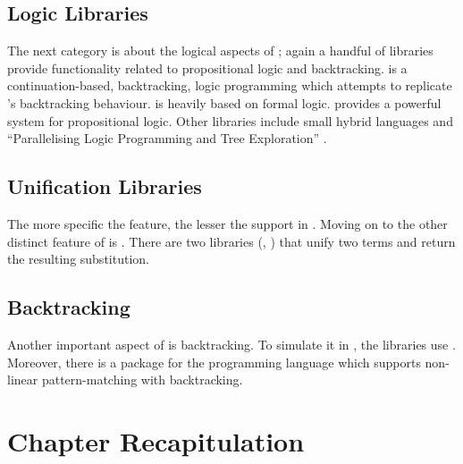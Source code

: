 \documentclass[thesis-solanki.tex]{subfiles}
\begin{document}
\subsection{Logic Libraries}

The next category is about the logical aspects of ; again a handful of libraries provide
functionality related to propositional logic and backtracking.
\cite{logict-lib} is a continuation-based, backtracking, logic programming  which attempts
to replicate
's backtracking behaviour.
 is heavily based on formal logic.
\cite{proplogic-lib} provides a powerful system for propositional logic.
Other libraries include small hybrid languages \cite{cflp-lib} and ``Parallelising Logic Programming and Tree
Exploration'' \cite{logic-grows-on-trees-lib}.


\subsection{Unification Libraries}

The more specific the feature, the lesser the support in .
Moving on to the other distinct feature of  is .
There are two libraries (\cite{unification-fd-lib}, \cite{cmu-lib}) that unify two  terms and return
the resulting substitution.


\subsection{Backtracking}

Another important aspect of  is backtracking.
To simulate it in , the libraries \cite{stream-monad-lib, logicst-lib} use .
Moreover, there is a package for the  programming language \cite{egison-lib} which supports
non-linear pattern-matching with backtracking.




\section{Chapter Recapitulation}


\ifMain
\begin{scope}
  \nolinenumbers
  \enotesize
  \par
  \begin{singlespace}
  \setlength{\parskip}{12pt plus 2pt minus 1pt}
  \theendnotes
  \par
  \end{singlespace}
\end{scope}
\fi
\end{document}
